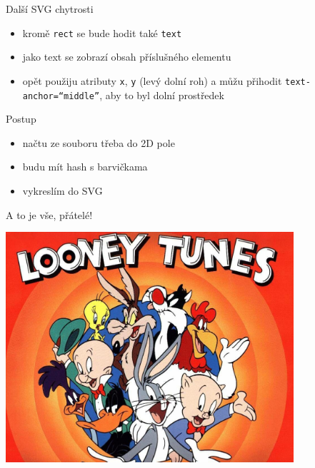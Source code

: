 \documentclass{beamer}
\begin{document}
\begin{frame}{Další SVG chytrosti}
  \begin{itemize}
    \item kromě \texttt{rect} se bude hodit také \texttt{text}
    \item jako text se zobrazí obsah příslušného elementu
    \item opět použiju atributy \texttt{x}, \texttt{y} (levý dolní roh) a můžu přihodit \texttt{text-anchor=``middle''}, aby to byl dolní prostředek
  \end{itemize}
\end{frame}

\begin{frame}{Postup}
  \begin{itemize}
    \item načtu ze souboru třeba do 2D pole
    \item budu mít hash s barvičkama
    \item vykreslím do SVG
  \end{itemize}
\end{frame}

\begin{frame}{A to je vše, přátelé!}
  \begin{center}
    \includegraphics[width=0.8\textwidth]{looney_tunes}
  \end{center}
\end{frame}
\end{document}
